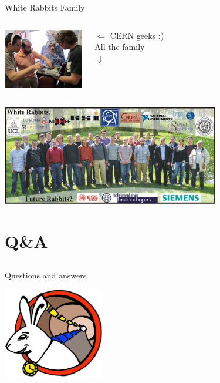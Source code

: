 \documentclass[compress,red]{beamer}
\begin{document}
\begin{frame}{White Rabbits Family}
\begin{columns}[c]
\column{2.0in}
    \begin{center}
    \includegraphics[width=3.5cm]{misc/fourRabbits.png}
    \end{center}
\column{2.0in}
    \begin{center}
    $\Leftarrow$ CERN geeks :) \\
    All the family \\
    $\Downarrow$
     \end{center}
\end{columns}

\begin{center}
\includegraphics[width=9.5cm]{misc/WRfamily.png}
\end{center}
\end{frame}
\section{Q\&A}
\subsection{}
\begin{frame}{Questions and answers}

    \begin{center}
    \includegraphics[height=4.0cm]{logo/WRlogo.pdf}
    \end{center}

\end{frame}
\end{document}
